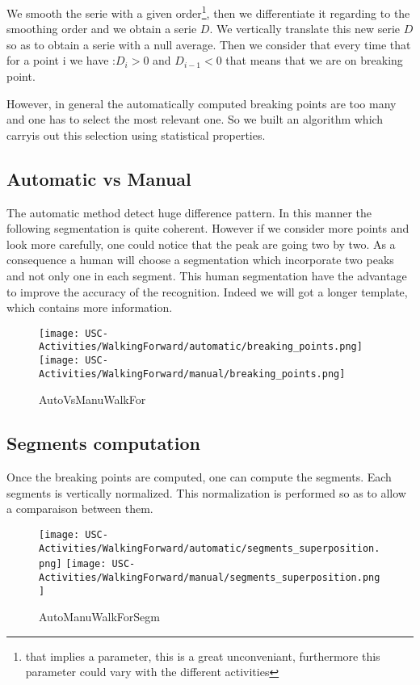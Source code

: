 \documentclass[a4,12pt]{article}
\begin{document}
		We smooth the serie with a given order\footnote{that implies a parameter, this is a great unconveniant, furthermore this parameter could vary with the different activities}, then we differentiate it regarding to the smoothing order and we obtain a serie $D$. We vertically translate this new serie $D$ so as to obtain a serie with a null average. Then we consider that every time that for a point i we have :$D_{i}>0$ and $D_{i-1}<0$ that means that we are on breaking point.
		
		However, in general the automatically computed breaking points are too many and one has to select the most relevant one. So we built an algorithm which carryis out this selection using statistical properties.
		
	\subsection{Automatic vs Manual}
	
	The automatic method detect huge difference pattern. In this manner the following segmentation is quite coherent. However if we consider more points and look more carefully, one could notice that the peak  are going two by two. As a consequence a human will choose a segmentation which incorporate two peaks and not only one in each segment. This human segmentation have the advantage to improve the accuracy of the recognition. Indeed we will got a longer template, which contains more information. 
	
	\begin{figure}[H]
		\centering
		\texttt{[image: USC-Activities/WalkingForward/automatic/breaking\_points.png]}
		\texttt{[image: USC-Activities/WalkingForward/manual/breaking\_points.png]}
		\caption{AutoVsManuWalkFor}
		\label{Walking Forward}
	\end{figure}
		
	\subsection{Segments computation}
		
		Once the breaking points are computed, one can compute the segments. Each segments is vertically normalized. This normalization is performed so as to allow a comparaison between them.
		
	\begin{figure}[H]
		\centering
		\texttt{[image: USC-Activities/WalkingForward/automatic/segments\_superposition.png]}
		\texttt{[image: USC-Activities/WalkingForward/manual/segments\_superposition.png]}
		\caption{AutoManuWalkForSegm}
		\label{Walking Forward}
	\end{figure}
	
\end{document}
